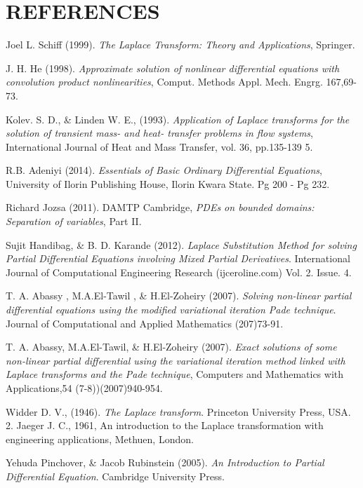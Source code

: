 \documentclass[11pt]{report}
\begin{document}
	\chapter*{REFERENCES}
	\begin{description}
		\item Joel L. Schiff (1999). \emph{The Laplace Transform: Theory and Applications}, Springer.
		
		\item J. H. He (1998). \emph{Approximate solution of nonlinear differential equations with convolution product nonlinearities}, Comput. Methods Appl. Mech. Engrg. 167,69-73.
		
		\item  Kolev. S. D., \& Linden W. E., (1993). \emph{Application of Laplace transforms for the solution of transient mass- and heat- transfer problems in flow systems}, International Journal of Heat and Mass Transfer, vol. 36, pp.135-139 5. 
		
		\item R.B. Adeniyi (2014). \emph{Essentials of Basic Ordinary Differential Equations}, University of Ilorin Publishing House, Ilorin Kwara State. Pg 200 - Pg 232.
		
		\item Richard Jozsa (2011). DAMTP Cambridge, \emph{PDEs on bounded domains: Separation of variables}, Part II.
		
		\item Sujit Handibag, \& B. D. Karande (2012). \emph{Laplace Substitution Method for solving Partial Differential Equations involving Mixed Partial Derivatives}. International Journal of Computational Engineering Research (ijceroline.com) Vol. 2. Issue. 4.
		
		\item T. A. Abassy , M.A.El-Tawil , \& H.El-Zoheiry (2007). \emph{Solving non-linear partial differential equations using the modified variational iteration Pade technique}. Journal of Computational and Applied Mathematics (207)73-91.
		
		\item T. A. Abassy, M.A.El-Tawil, \& H.El-Zoheiry (2007). \emph{Exact solutions of some non-linear partial differential using the variational iteration method linked with Laplace transforms and the Pade technique}, Computers and Mathematics with Applications,54 (7-8))(2007)940-954.
		
		\item Widder D. V., (1946). \emph{The Laplace transform}. Princeton University Press, USA. 2. Jaeger J. C., 1961, An introduction to the Laplace transformation with engineering applications, Methuen, London. 
		
		\item Yehuda Pinchover, \& Jacob Rubinstein (2005). \emph{An Introduction to Partial Differential Equation}. Cambridge University Press.
	\end{description}
\end{document}
